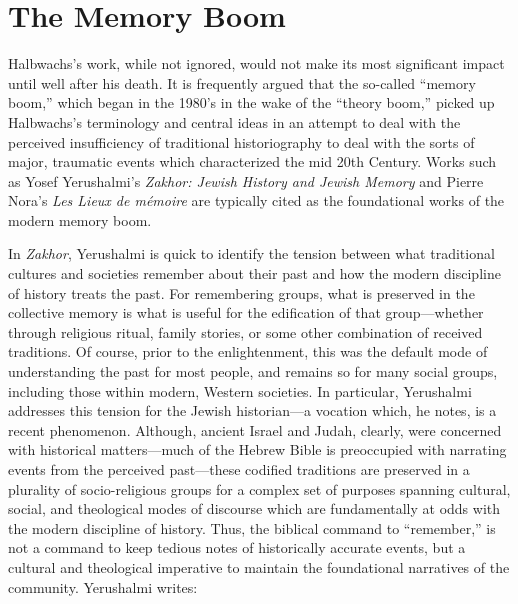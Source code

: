 \hypertarget{the-memory-boom}{%
\section{The Memory Boom}\label{the-memory-boom}}

Halbwachs's work, while not ignored, would not make its most significant
impact until well after his death. It is frequently argued that the
so-called ``memory boom,'' which began in the 1980's in the wake of the
``theory boom,'' picked up Halbwachs's terminology and central ideas in
an attempt to deal with the perceived insufficiency of traditional
historiography to deal with the sorts of major, traumatic events which
characterized the mid 20th
Century.\autocites[1--2]{galinsky_galinsky2016}[See also][29--36. One
cannot help but speculate that---at least in the English-speaking
world---the translation of \emph{The Collective Memory} in 1980
contributed to the popularity of Halbwachs's
terminology.]{olick_olick-etal2011} Works such as Yosef Yerushalmi's
\emph{Zakhor: Jewish History and Jewish Memory} and Pierre Nora's
\emph{Les Lieux de mémoire} are typically cited as the foundational
works of the modern memory
boom.\autocites[112--113]{klein2011}{yerushalmi1989}[Nora's massive
project has been abridged and translated into English as][]{nora1996}

In \emph{Zakhor}, Yerushalmi is quick to identify the tension between
what traditional cultures and societies remember about their past and
how the modern discipline of history treats the past. For remembering
groups, what is preserved in the collective memory is what is useful for
the edification of that group---whether through religious ritual, family
stories, or some other combination of received traditions. Of course,
prior to the enlightenment, this was the default mode of understanding
the past for most people, and remains so for many social groups,
including those within modern, Western societies. In particular,
Yerushalmi addresses this tension for the Jewish historian---a vocation
which, he notes, is a recent phenomenon. Although, ancient Israel and
Judah, clearly, were concerned with historical matters---much of the
Hebrew Bible is preoccupied with narrating events from the perceived
past---these codified traditions are preserved in a plurality of
socio-religious groups for a complex set of purposes spanning cultural,
social, and theological modes of discourse which are fundamentally at
odds with the modern discipline of history. Thus, the biblical command
to ``remember,'' is not a command to keep tedious notes of historically
accurate events, but a cultural and theological imperative to maintain
the foundational narratives of the community. Yerushalmi writes:

